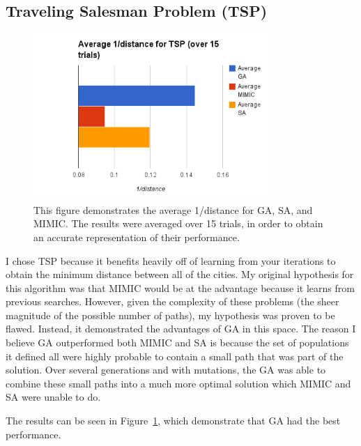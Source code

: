 \documentclass[annual]{acmsiggraph}
\begin{document}
\subsection{Traveling Salesman Problem (TSP)}
\begin{figure}[ht]
  \centering
  \includegraphics[width=3.5in]{charts/g7_tsp.png}
  \caption{This figure demonstrates the average 1/distance for GA, SA, and MIMIC. The results were averaged over 15 trials, in order
  to obtain an accurate representation of their performance.}
  \label{fig:g7}
\end{figure}
I chose TSP because it benefits heavily off of learning from your iterations to obtain the minimum distance between all of the 
cities. My original hypothesis for this algorithm was that MIMIC would be at the advantage because it learns from previous searches. However, given the complexity of these problems (the sheer magnitude of the possible number of paths), my hypothesis was proven to be flawed. Instead, it demonstrated the advantages of GA in this space. The reason I believe GA outperformed both MIMIC and SA is because the set of populations it defined all were highly probable to contain a small path that was part of the solution. Over several generations and with mutations, the GA was able to combine these small paths into a much more optimal solution which MIMIC and SA were unable to do.

The results can be seen in Figure~\ref{fig:g7}, which demonstrate that GA had the best performance.
\end{document}
